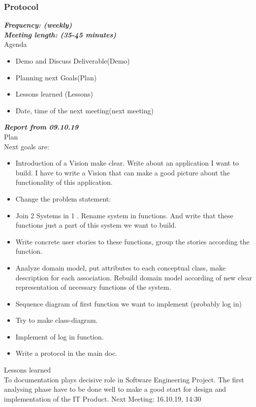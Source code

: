 \documentclass{scrartcl}
\begin{document}
   
   
   
    
   
  

\subsubsection{Protocol}
\textbf{\textit{Frequency: (weekly) \\
Meeting length: (35-45 minutes)}}\\

Agenda

\begin{itemize}
  	\item Demo and Discuss Deliverable(Demo)
  	\item Planning next Goals(Plan)
  	\item Lessons learned (Lessons)
  	\item Date, time of the next meeting(next meeting)
 \end{itemize} 	


\textbf{\textit{Report from 09.10.19}}\\
Plan\\
Next goals are: 
\begin{itemize}


	\item Introduction of a Vision make clear. Write about an application I want to build. I have to write a Vision that can make a good picture about the functionality of this application.
	\item	Change the problem statement: 
	\item	Join 2 Systems in 1 . Rename system in functions. And write that these functions just a part of this system we want to build. 
	\item	Write concrete user stories to these functions, group the stories according the function.
	\item	Analyze domain model, put attributes to each conceptual class, make description for each association. Rebuild domain model according of new clear representation of necessary functions of the system.
	\item	Sequence diagram of first function we want to implement (probably log in)
	\item	Try to make class-diagram.
	\item	Implement of log in function.
	\item	Write a protocol in the main doc.
\end{itemize}	
Lessons learned\\
To documentation plays decisive role in Software Engineering Project. The first analysing phase have to be done well to make a good start for design and implementation of the IT Product.
Next Meeting: 16.10.19, 14:30\\
\end{document}
